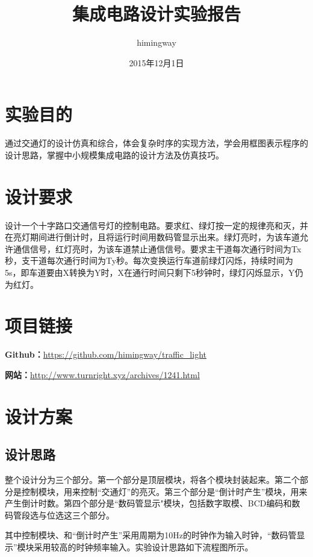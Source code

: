 \documentclass[12pt,a4paper]{article}
\title{\textbf{\CJKfamily{hei}集成电路设计实验报告}}
\author{himingway}
\date{2015年12月1日}
\begin{document}
	\maketitle
	\section{实验目的}
	通过交通灯的设计仿真和综合，体会复杂时序的实现方法，学会用框图表示程序的设计思路，掌握中小规模集成电路的设计方法及仿真技巧。
	\section{设计要求}
	
	设计一个十字路口交通信号灯的控制电路。要求红、绿灯按一定的规律亮和灭，并在亮灯期间进行倒计时，且将运行时间用数码管显示出来。绿灯亮时，为该车道允许通信信号，红灯亮时，为该车道禁止通信信号。要求主干道每次通行时间为Tx秒，支干道每次通行时间为Ty秒。每次变换运行车道前绿灯闪烁，持续时间为5s，即车道要由X转换为Y时，X在通行时间只剩下5秒钟时，绿灯闪烁显示，Y仍为红灯。
	
	\section{项目链接}
		\textbf{Github：}\url{https://github.com/himingway/traffic_light}
		
		\textbf{网站：}\url{http://www.turnright.xyz/archives/1241.html}
		
	\section{设计方案}
		\subsection{设计思路}
		整个设计分为三个部分。第一个部分是顶层模块，将各个模块封装起来。第二个部分是控制模块，用来控制“交通灯”的亮灭。第三个部分是“倒计时产生”模块，用来产生倒计时数。第四个部分是“数码管显示"模块，包括数字取模、BCD编码和数码管段选与位选这三个部分。
		
		其中控制模块、和“倒计时产生”采用周期为10Hz的时钟作为输入时钟，“数码管显示”模块采用较高的时钟频率输入。实验设计思路如下流程图所示。
\end{document}

